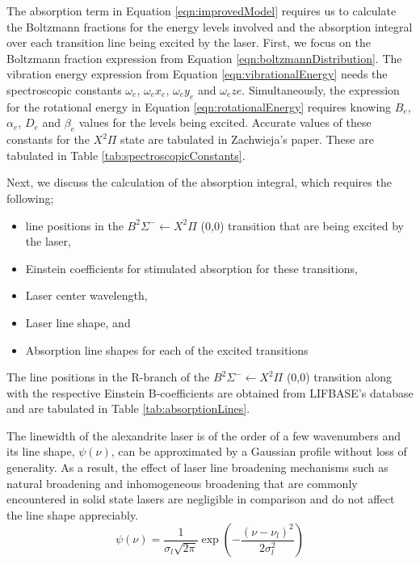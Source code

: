 The absorption term in Equation \ref{eqn:improvedModel} requires us to calculate the Boltzmann fractions for the energy levels involved and the absorption integral over each transition line being excited by the laser.
First, we focus on the Boltzmann fraction expression from Equation \ref{eqn:boltzmannDistribution}.
The vibration energy expression from Equation \ref{eqn:vibrationalEnergy} needs the spectroscopic constants \(\omega_e\), \(\omega_e x_e\), \(\omega_e y_e\) and \(\omega_e ze\).
Simultaneously, the expression for the rotational energy in Equation \ref{eqn:rotationalEnergy} requires knowing \(B_e\), \(\alpha_e\), \(D_e\) and \(\beta_e\) values for the levels being excited.
Accurate values of these constants for the \(X^2\Pi\) state are tabulated in Zachwieja's\cite{1995-zachwieja} paper.
These are tabulated in Table \ref{tab:spectroscopicConstants}.



Next, we discuss the calculation of the absorption integral, which requires the following;

\begin{itemize}
  \item line positions in the \(B^2\Sigma^-\leftarrow X^2\Pi\) (0,0) transition that are being excited by the laser,
  \item Einstein coefficients for stimulated absorption for these transitions,
  \item Laser center wavelength,
  \item Laser line shape, and
  \item Absorption line shapes for each of the excited transitions
\end{itemize}

The line positions in the R-branch of the \(B^2\Sigma^-\leftarrow X^2\Pi\) (0,0) transition along with the respective Einstein B-coefficients are obtained from LIFBASE's database and are tabulated in Table \ref{tab:absorptionLines}.



The linewidth of the alexandrite laser is of the order of a few wavenumbers and its line shape, \(\psi(\nu)\), can be approximated by a Gaussian profile without loss of generality.
As a result, the effect of laser line broadening mechanisms such as natural broadening and inhomogeneous broadening that are commonly encountered in solid state lasers are negligible in comparison and do not affect the line shape appreciably.
\begin{equation}
  \psi(\nu) = \frac{1}{\sigma_l\sqrt{2\pi}} \exp{\left(-\dfrac{(\nu-\nu_l)^2}{2\sigma_l^2}\right)}
  \label{eqn:laserLineShape}
\end{equation}

